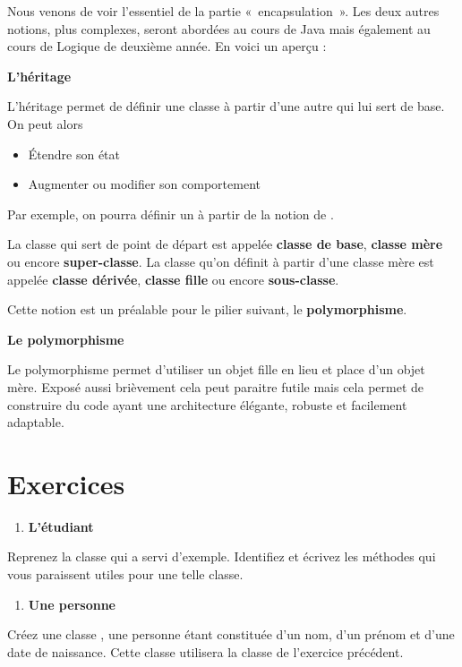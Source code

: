 {
Nous venons de voir l'essentiel de la partie
«~encapsulation~». Les deux autres notions, plus complexes, seront
abordées au cours de Java mais également au cours de Logique de
deuxième année. En voici un aperçu :}

{\sffamily\bfseries\upshape
L'héritage}

{
L’héritage permet de définir une classe à partir d’une autre qui lui
sert de base.} 
{On peut alors}

\liststyleListv
\begin{itemize}
\item {
Étendre son état}
\item {
Augmenter ou modifier son comportement}
\end{itemize}
{
Par exemple, on pourra définir un  à partir
de la notion de .}

{
La classe qui sert de point de départ est appelée \textbf{classe de
base}, \textbf{classe mère} ou encore \textbf{super-classe}. La classe
qu’on définit à partir d’une classe mère est appelée \textbf{classe
dérivée}, \textbf{classe fille} ou encore \textbf{sous-classe}.}

{
Cette notion est un préalable pour le pilier suivant, le
\textbf{polymorphisme}.}

{\sffamily\bfseries\upshape
Le polymorphisme}

{
Le polymorphisme permet d’utiliser un objet fille en lieu et place d’un
objet mère.} 
{Exposé aussi brièvement cela peut paraitre futile mais cela
permet de construire du code ayant une architecture élégante, robuste
et facilement adaptable.}

\section{Exercices}
\liststyleExercice
\begin{enumerate}
\item {\sffamily\bfseries
L'étudiant}
\end{enumerate}
{
Reprenez la classe  qui a servi
d'exemple. Identifiez et écrivez les méthodes qui vous
paraissent utiles pour une telle classe.}

\liststyleExercice
\setcounter{saveenum}{\value{enumi}}
\begin{enumerate}
\setcounter{enumi}{\value{saveenum}}
\item {\sffamily\bfseries
Une personne}
\end{enumerate}
{
Créez une classe , une personne étant
constituée d'un nom, d'un prénom et
d'une date de naissance. Cette classe utilisera la
classe  de l'exercice
précédent.}

